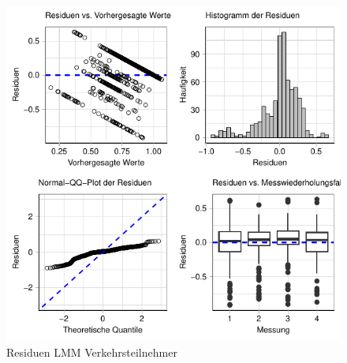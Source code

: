 \documentclass{article}
\begin{document}
\begin{figure}[H]
\begin{center}
\includegraphics{lmm_vt-002}
%

\end{center}
\caption{Residuen LMM Verkehrsteilnehmer}
\label{fig:one}
\end{figure}
\end{document}

